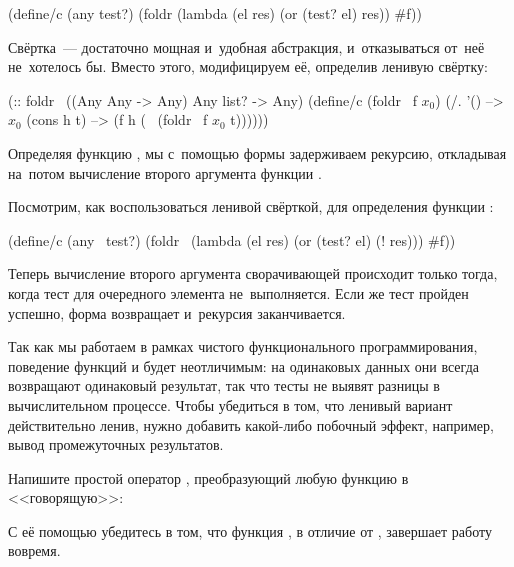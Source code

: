 \begin{Definition}[emph={el,res,test?,lst}]
(define/c (any test?)
  (foldr (lambda (el res) (or (test? el) res)) #f))
\end{Definition}

Свёртка~--- достаточно мощная и~удобная абстракция, и~отказываться от~неё не~хотелось бы. Вместо этого, модифицируем её, определив ленивую свёртку:

\begin{Definition}[emph={f,lst,h,t}]
(:: foldr~ ((Any Any -> Any) Any list? -> Any)
 (define/c (foldr~ f $x_0$)
   (/. '() --> $x_0$
       (cons h t) --> (f h (~ (foldr~ f $x_0$ t))))))
\end{Definition}
Определяя функцию , мы с~помощью формы \s{~} задерживаем рекурсию, откладывая на~потом вычисление второго аргумента функции .

Посмотрим, как воспользоваться ленивой свёрткой, для определения функции :

\begin{Definition}[emph={test?,lst,el,res}]
(define/c (any~ test?)
  (foldr~ (lambda (el res) (or (test? el) (! res))) #f))
\end{Definition}
Теперь вычисление второго аргумента сворачивающей  происходит только тогда, когда тест для очередного элемента не~выполняется. Если же тест пройден успешно, форма  возвращает  и~рекурсия заканчивается.
\newpage

\begin{Assignment}
Так как мы работаем в рамках чистого функционального программирования, поведение функций  и  будет неотличимым: на одинаковых данных они всегда возвращают одинаковый результат, так что тесты не выявят разницы в вычислительном процессе. Чтобы убедиться в том, что ленивый вариант действительно ленив, нужно добавить какой-либо побочный эффект, например, вывод промежуточных результатов. 

\label{verbose}
Напишите простой оператор , преобразующий любую функцию  в <<говорящую>>:
\vspace{-\smallskipamount}
\vspace{-\smallskipamount}
\vspace{-\smallskipamount}
\vspace{-\smallskipamount}

С её помощью убедитесь в том, что функция , в отличие от , завершает работу вовремя.

\end{Assignment}

